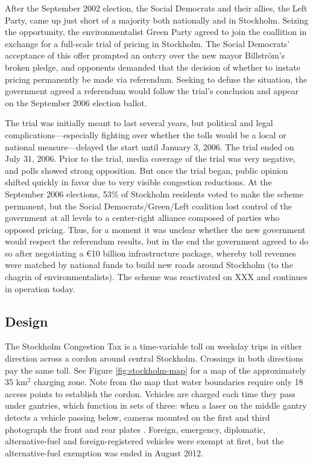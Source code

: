 After the September 2002 election, the Social Democrats and their allies, the Left Party, came up just short of a majority both nationally and in Stockholm. Seizing the opportunity, the environmentalist Green Party agreed to join the coallition in exchange for a full-scale trial of pricing in Stockholm. The Social Democrats' acceptance of this offer prompted an outcry over the new mayor Billstr\"om's broken pledge, and opponents demanded that the decision of whether to instate pricing permanently be made via referendum. Seeking to defuse the situation, the government agreed a referendum would follow the trial's conclusion and appear on the September 2006 election ballot.

The trial was initially meant to last several years, but political and legal complications---especially fighting over whether the tolls would be a local or national measure---delayed the start until January 3, 2006. The trial ended on July 31, 2006. Prior to the trial, media coverage of the trial was very negative, and polls showed strong opposition. But once the trial began, public opinion shifted quickly in favor due to very visible congestion reductions. At the September 2006 elections, 53\% of Stockholm residents voted to make the scheme permanent, but the Social Democrats/Green/Left coalition lost control of the government at all levels to a center-right alliance composed of parties who opposed pricing. Thus, for a moment it was unclear whether the new government would respect the referendum results, but in the end the government agreed to do so after negotiating a \euro 10 billion infrastructure package, whereby toll revenues were matched by national funds to build new roads around Stockholm (to the chagrin of environmentalists). The scheme was reactivated on XXX and continues in operation today.

\subsection{Design}

The Stockholm Congestion Tax is a time-variable toll on weekday trips in either direction across a cordon around central Stockholm. Crossings in both directions pay the same toll. See Figure \ref{fig:stockholm-map} for a map of the approximately 35 km$^{2}$ charging zone. Note from the map that water boundaries require only 18 access points to establish the cordon. Vehicles are charged each time they pass under gantries, which function in sets of three: when a laser on the middle gantry detects a vehicle passing below, cameras mounted on the first and third photograph the front and rear plates \citep{FAQ2015}. Foreign, emergency, diplomatic, alternative-fuel and foreign-registered vehicles were exempt at first, but the alternative-fuel exemption was ended in August 2012.


